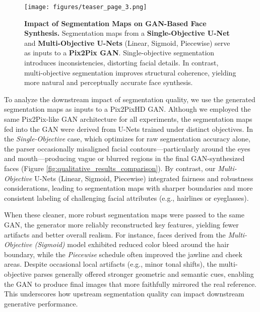 \begin{figure}[t]
        \texttt{[image: figures/teaser\_page\_3.png]}
\caption{\textbf{Impact of Segmentation Maps on GAN-Based Face Synthesis.}  
Segmentation maps from a \textbf{Single-Objective U-Net} and \textbf{Multi-Objective U-Nets} (Linear, Sigmoid, Piecewise) serve as inputs to a \textbf{Pix2Pix GAN}. Single-objective segmentation introduces inconsistencies, distorting facial details. In contrast, multi-objective segmentation improves structural coherence, yielding more natural and perceptually accurate face synthesis.}


    \label{fig:compare_composites}
\end{figure}

To analyze the downstream impact of segmentation quality, we use the generated segmentation maps as inputs to a Pix2PixHD GAN. Although we employed the same Pix2Pix-like GAN architecture for all experiments, the segmentation maps fed into the GAN were derived from U-Nets trained under distinct objectives. In the \emph{Single-Objective} case, which optimizes for raw segmentation accuracy alone, the parser occasionally misaligned facial contours—particularly around the eyes and mouth—producing vague or blurred regions in the final GAN-synthesized faces (Figure \ref{fig:qualitative_results_comparison}). By contrast, our \emph{Multi-Objective} U-Nets (Linear, Sigmoid, Piecewise) integrated fairness and robustness considerations, leading to segmentation maps with sharper boundaries and more consistent labeling of challenging facial attributes (e.g., hairlines or eyeglasses).

When these cleaner, more robust segmentation maps were passed to the same GAN, the generator more reliably reconstructed key features, yielding fewer artifacts and better overall realism. For instance, faces derived from the \emph{Multi-Objective (Sigmoid)} model exhibited reduced color bleed around the hair boundary, while the \emph{Piecewise} schedule often improved the jawline and cheek areas. Despite occasional local artifacts (e.g., minor tonal shifts), the multi-objective parses generally offered stronger geometric and semantic cues, enabling the GAN to produce final images that more faithfully mirrored the real reference. This underscores how upstream segmentation quality can impact downstream generative performance.

